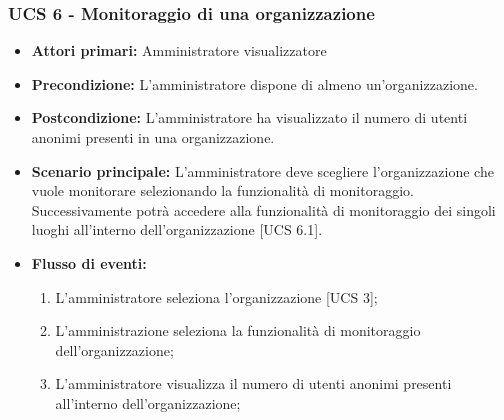 

\subsubsection{UCS 6 - Monitoraggio di una organizzazione}
\begin{itemize}
	\item \textbf{Attori primari:} Amministratore visualizzatore
	\item \textbf{Precondizione:} L'amministratore dispone di almeno un'organizzazione.
	\item \textbf{Postcondizione:} L'amministratore ha visualizzato il numero di utenti anonimi presenti in una organizzazione.
	\item \textbf{Scenario principale:} L'amministratore deve scegliere l'organizzazione che vuole monitorare selezionando la funzionalità di monitoraggio. Successivamente potrà accedere alla funzionalità di monitoraggio dei singoli luoghi all'interno dell'organizzazione [UCS 6.1].
	\item \textbf{Flusso di eventi:}
\begin{enumerate}
	\item L'amministratore seleziona l'organizzazione [UCS 3]; 
	\item L'amministrazione seleziona la funzionalità di monitoraggio dell'organizzazione;
	\item L'amministratore visualizza il numero di utenti anonimi presenti all'interno dell'organizzazione;
\end{enumerate}
\end{itemize}

